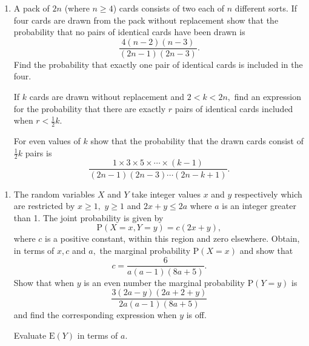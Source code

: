 \documentclass[a4, 11pt]{report}
\newlength{\qspace}
\newcounter{qnumber}
\newenvironment{question}%
 {\vspace{\qspace}
  \begin{enumerate}[\bfseries 1\quad][10]%
    \setcounter{enumi}{\value{qnumber}}%
    \item%
 }
{
  \end{enumerate}
  \filbreak
  \stepcounter{qnumber}
 }
\begin{document}
\begin{question}
A pack of $2n$ (where $n\geqslant4$) cards consists of two each
of $n$ different sorts. If four cards are drawn from the pack without
replacement show that the probability that no pairs of identical cards
have been drawn is 
\[
\frac{4(n-2)(n-3)}{(2n-1)(2n-3)}.
\]
Find the probability that exactly one pair of identical cards is included
in the four. 


If $k$ cards are drawn without replacement and $2<k<2n,$ find an
expression for the probability that there are exactly $r$ pairs of
identical cards included when $r<\frac{1}{2}k.$ 


For even values of $k$ show that the probability that the drawn cards
consist of $\frac{1}{2}k$ pairs is 
\[
\frac{1\times3\times5\times\cdots\times(k-1)}{(2n-1)(2n-3)\cdots(2n-k+1)}.
\] 
\end{question}

\begin{question}
The random variables $X$ and $Y$ take integer values $x$ and $y$
respectively which are restricted by $x\geqslant1,$ $y\geqslant1$
and $2x+y\leqslant2a$ where $a$ is an integer greater than 1. The
joint probability is given by 
\[
\mathrm{P}(X=x,Y=y)=c(2x+y),
\]
where $c$ is a positive constant, within this region and zero elsewhere.
Obtain, in terms of $x,c$ and $a,$ the marginal probability $\mathrm{P}(X=x)$
and show that 
\[
c=\frac{6}{a(a-1)(8a+5)}.
\]
Show that when $y$ is an even number the marginal probability $\mathrm{P}(Y=y)$
is 
\[
\frac{3(2a-y)(2a+2+y)}{2a(a-1)(8a+5)}
\]
and find the corresponding expression when $y$ is off. 


Evaluate $\mathrm{E}(Y)$ in terms of $a$.

\end{question}
\end{document}
